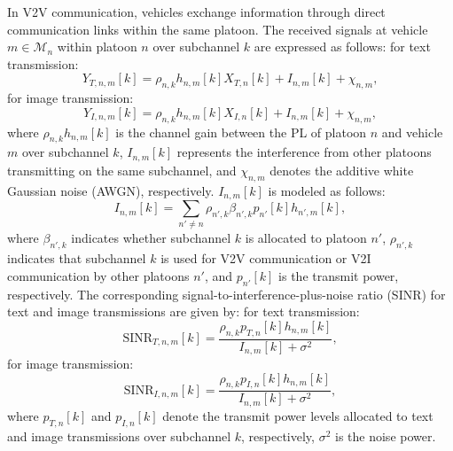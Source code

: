 \documentclass[10pt, lettersize,journal]{IEEEtran}
\begin{document}
	In V2V communication, vehicles exchange information through direct communication links within the same platoon. The received signals at vehicle $m \in \mathcal{M}_{n}$ within platoon $n$ over subchannel $k$ are expressed as follows:
	for text transmission: 
	\begin{equation}\label{eq3}
		Y_{T, n, m}[k] = \rho_{n,k} h_{n, m}[k] X_{T, n}[k] + I_{n, m}[k] + {\chi _{n,m}},
	\end{equation} 
	for image transmission: 
	\begin{equation}\label{eq40}
		Y_{I, n, m}[k] = \rho_{n,k} h_{n, m}[k] X_{I, n}[k] + I_{n, m}[k] + {\chi _{n,m}},
	\end{equation} 
	where $\rho_{n,k} h_{n, m}[k]$ is the channel gain between the PL of platoon $n$ and vehicle $m$ over subchannel $k$, $I_{n, m}[k]$ represents the interference from other platoons transmitting on the same subchannel, and $\chi_{n,m}$ denotes the additive white Gaussian noise (AWGN), respectively. $I_{n, m}[k]$ is modeled as follows:
	\begin{equation}\label{eq40}
		{I_{n,m}}[k] = \sum\limits_{n' \ne n} {{\rho _{n',k}}{\beta _{n',k}}} {p_{n'}}[k]{h_{n',m}}[k],
	\end{equation}
	where ${{\beta _{n',k}}}$ indicates whether subchannel $k$ is allocated to platoon ${n'}$, \(\rho_{n',k}\) indicates that subchannel \(k\) is used for V2V communication or V2I communication by other platoons \(n'\), and ${{p}_{n'}}[k]$ is the transmit power, respectively.
	The corresponding signal-to-interference-plus-noise ratio (SINR) for text and image transmissions are given by: for text transmission: 
	\begin{equation}\label{eq5}
		\text{SINR}_{T,n,m}[k] = \frac{\rho_{n,k} p_{T,n}[k] h_{n,m}[k]}{I_{n, m}[k] + \sigma^2},
	\end{equation}
	for image transmission: 
	\begin{equation}\label{eq6}
		\text{SINR}_{I,n,m}[k] = \frac{\rho_{n,k} p_{I,n}[k] h_{n,m}[k]}{I_{n, m}[k] + \sigma^2},
	\end{equation}
	where ${{p_{T,n}}[k]}$ and ${{p_{I,n}}[k]}$ denote the transmit power levels allocated to text and image transmissions  over subchannel $k$, respectively, ${\sigma ^2}$ is the noise power.
	
\end{document}
